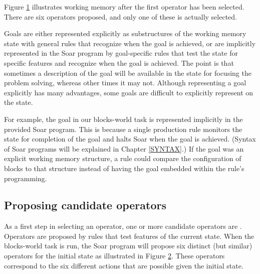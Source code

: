 Figure \ref{fig:ab-wmem2} illustrates working memory after the first operator
has been selected. There are six operators proposed, and only one of
these is actually selected.

\begin{figure}
\label{fig:ab-wmem2}
\end{figure}

Goals are either represented explicitly as substructures of the working memory state
with general rules that recognize when the goal is achieved, or are
implicitly represented in the Soar program by goal-specific rules that
test the state for specific features and recognize when the goal is
achieved.  The point is that sometimes a description of the goal will be
available in the state for focusing the problem solving, whereas other
times it may not.  Although representing a goal explicitly has many advantages,
some goals are difficult to explicitly represent on the state.

For example, the goal in our blocks-world task is represented implicitly in the provided Soar program. This is because a single production rule monitors the state for completion of the goal and halts Soar when the goal is achieved. (Syntax of Soar programs will be explained in Chapter \ref{SYNTAX}.) If the goal was an explicit working memory structure, a rule could compare the configuration of blocks to that structure instead of having the goal embedded within the rule's programming.

\subsection{Proposing candidate operators}

As a first step in selecting an operator, one or more candidate
operators are .  Operators are proposed by rules that test
features of the current state.  When the blocks-world task is run, the
Soar program will propose six distinct (but similar) operators for the
initial state as illustrated in Figure \ref{fig:proposal}. These
operators correspond to the six different actions that are possible
given the initial state.

\begin{figure}
\label{fig:proposal}
\end{figure}


